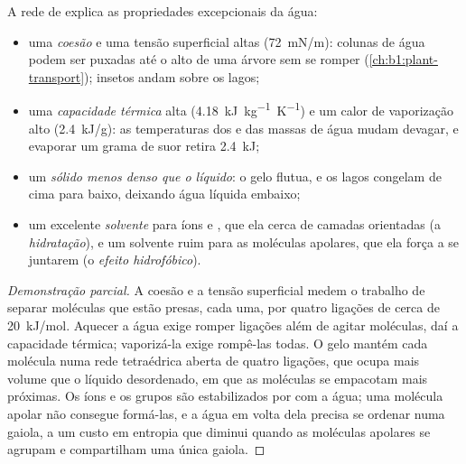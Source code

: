 \begin{proposition}\label{prop:b1:water-small-molecules:properties}
A rede de  explica as propriedades excepcionais da
água:
\begin{itemize}
  \item uma \emph{coesão} e uma tensão superficial altas
        (\qty{72}{mN/m}): colunas de água podem ser puxadas até o alto
        de uma árvore sem se romper
        (\cref{ch:b1:plant-transport}); insetos andam sobre os lagos;
  \item uma \emph{capacidade térmica} alta
        (\qty{4.18}{kJ.kg^{-1}.K^{-1}}) e um calor de vaporização alto
        (\qty{2.4}{kJ/g}): as temperaturas dos  e das massas
        de água mudam devagar, e evaporar um grama de suor retira
        \qty{2.4}{kJ};
  \item um \emph{sólido menos denso que o líquido}: o gelo flutua, e os
        lagos congelam de cima para baixo, deixando água líquida embaixo;
  \item um excelente \emph{solvente} para íons e , que
        ela cerca de camadas orientadas (a \emph{hidratação}), e um
        solvente ruim para as moléculas apolares, que ela força a se
        juntarem (o \emph{efeito hidrofóbico}).
\end{itemize}
\end{proposition}
\begin{proof}[Demonstração parcial]
A coesão e a tensão superficial medem o trabalho de separar moléculas
que estão presas, cada uma, por quatro ligações de cerca de
\qty{20}{kJ/mol}. Aquecer a água exige romper ligações além de agitar
moléculas, daí a capacidade térmica; vaporizá-la exige rompê-las todas.
O gelo mantém cada molécula numa rede tetraédrica aberta de quatro
ligações, que ocupa mais volume que o líquido desordenado, em que as
moléculas se empacotam mais próximas. Os íons e os grupos  são
estabilizados por  com a água; uma molécula apolar
não consegue formá-las, e a água em volta dela precisa se ordenar numa
gaiola, a um custo em entropia que diminui quando as moléculas apolares
se agrupam e compartilham uma única gaiola.
\end{proof}

